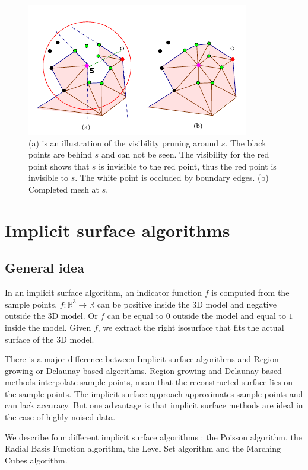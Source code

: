 \documentclass[12pt]{article}
\begin{document}
\begin{figure}[h]
  \centering
  \includegraphics[scale=0.5]{proj.png}
  \caption{\label{proj} (a) is an illustration of the visibility pruning around $s$. The black points are behind $s$ and can not be seen. The visibility for the red point shows that $s$ is invisible to the red point, thus the red point is invisible to $s$. The white point is occluded by boundary edges. (b) Completed mesh at $s$.
}
\end{figure}


\newpage

\section{Implicit surface algorithms}
\subsection{General idea}
In an implicit surface algorithm, an indicator function $f$ is computed from the sample points. $f:\mathbb{R}^3 \to \mathbb{R}$ can be positive inside the 3D model and negative outside the 3D model. Or $f$ can be equal to $0$ outside the model and equal to $1$ inside the model. Given $f$, we extract the right isosurface that fits the actual surface of the 3D model.

There is a major difference between Implicit surface algorithms and Region-growing or Delaunay-based algorithms. Region-growing and Delaunay based methods interpolate sample points, mean that the reconstructed surface lies on the sample points. The implicit surface approach approximates sample points and can lack accuracy. But one advantage is that implicit surface methods are ideal in the case of highly noised data.

We describe four different implicit surface algorithms : the Poisson algorithm, the Radial Basis Function algorithm, the Level Set algorithm and the Marching Cubes algorithm.
\end{document}

